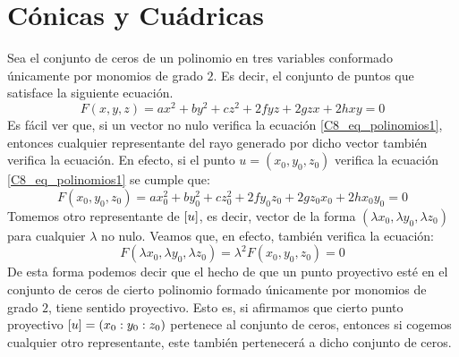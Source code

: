 \chapter{Cónicas y Cuádricas}
\label{C8}
Sea el conjunto de ceros de un polinomio en tres variables conformado únicamente por monomios de grado $2$. Es decir, el conjunto de puntos que satisface la siguiente ecuación.
\begin{equation}
	\label{C8_eq_polinomios1}
	F(x,y,z)=ax^2+by^2+cz^2+2fyz+2gzx+2hxy=0
\end{equation}
Es fácil ver que, si un vector no nulo verifica la ecuación \eqref{C8_eq_polinomios1}, entonces cualquier representante del rayo generado por dicho vector también verifica la ecuación. En efecto, si el punto $u=(x_0,y_0,z_0)$ verifica la ecuación \eqref{C8_eq_polinomios1} se cumple que:
\[F(x_0,y_0,z_0)=ax_0^2+by_0^2+cz_0^2+2fy_0z_0+2gz_0x_0+2hx_0y_0=0\]
Tomemos otro representante de $\left [ u \right ]$, es decir, vector de la forma $(\lambda x_0, \lambda y_0, \lambda z_0)$ para cualquier $\lambda$ no nulo. Veamos que, en efecto, también verifica la ecuación:
\[F(\lambda x_0, \lambda y_0, \lambda z_0)=\lambda^2F(x_0,y_0,z_0)=0\]
De esta forma podemos decir que el hecho de que un punto proyectivo esté en el conjunto de ceros de cierto polinomio formado únicamente por monomios de grado $2$, tiene sentido proyectivo. Esto es, si afirmamos que cierto punto proyectivo $\left [ u \right ]=(x_0:y_0:z_0)$ pertenece al conjunto de ceros, entonces si cogemos cualquier otro representante, este también pertenecerá a dicho conjunto de ceros.